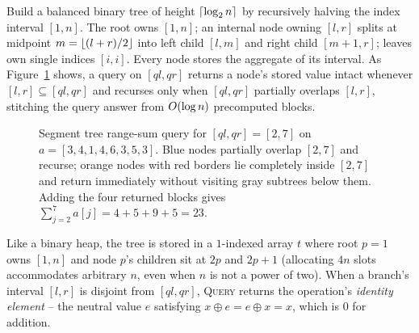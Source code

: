 \begin{intuitionbox}
Build a balanced binary tree of height $\lceil\log_2 n\rceil$ by recursively halving the index interval $[1,n]$. The root owns $[1,n]$; an internal node owning $[l,r]$ splits at midpoint $m = \lfloor(l+r)/2\rfloor$ into left child $[l,m]$ and right child $[m+1,r]$; leaves own single indices $[i,i]$. Every node stores the aggregate of its interval. As Figure~\ref{ch42:fig-segtree-query} shows, a query on $[ql, qr]$ returns a node's stored value intact whenever $[l,r] \subseteq [ql,qr]$ and recurses only when $[ql,qr]$ partially overlaps $[l,r]$, stitching the query answer from $O(\log n)$ precomputed blocks.
\end{intuitionbox}

\begin{figure}[htbp]
\centering
{}
\caption{Segment tree range-sum query for $[ql,qr] = [2, 7]$ on $a=[3,4,1,4,6,3,5,3]$. Blue nodes partially overlap $[2,7]$ and recurse; orange nodes with red borders lie completely inside $[2,7]$ and return immediately without visiting gray subtrees below them. Adding the four returned blocks gives $\sum_{j=2}^7 a[j] = 4 + 5 + 9 + 5 = 23$.}
\label{ch42:fig-segtree-query}
\end{figure}

Like a binary heap, the tree is stored in a $1$-indexed array $t$ where root $p=1$ owns $[1,n]$ and node $p$'s children sit at $2p$ and $2p+1$ (allocating $4n$ slots accommodates arbitrary $n$, even when $n$ is not a power of two). When a branch's interval $[l,r]$ is disjoint from $[ql,qr]$, \textsc{Query} returns the operation's \emph{identity element} -- the neutral value $e$ satisfying $x \oplus e = e \oplus x = x$, which is $0$ for addition.

